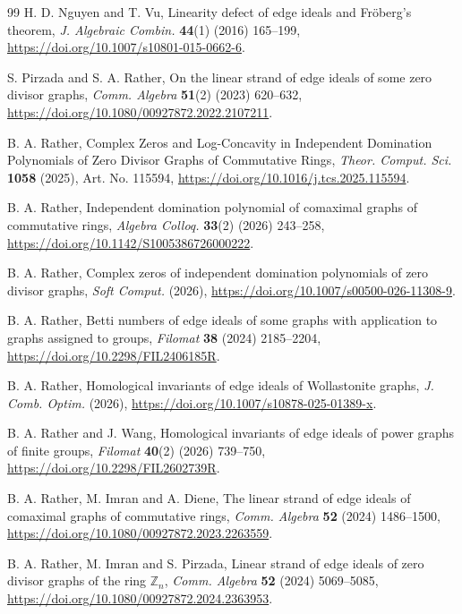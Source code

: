 \documentclass[12pt]{article}
\theoremstyle{definition}
\begin{document}
\begin{thebibliography}{99}
H. D. Nguyen and T. Vu,
Linearity defect of edge ideals and Fröberg's theorem,
\emph{J. Algebraic Combin.} \textbf{44}(1) (2016) 165--199,
\url{https://doi.org/10.1007/s10801-015-0662-6}.

S. Pirzada and S. A. Rather,
On the linear strand of edge ideals of some zero divisor graphs,
\emph{Comm. Algebra} \textbf{51}(2) (2023) 620--632,
\url{https://doi.org/10.1080/00927872.2022.2107211}.

B. A. Rather,
Complex Zeros and Log-Concavity in Independent Domination Polynomials of Zero Divisor Graphs of Commutative Rings,
\emph{Theor. Comput. Sci.} \textbf{1058} (2025), Art. No. 115594,
\url{https://doi.org/10.1016/j.tcs.2025.115594}.

B. A. Rather,
Independent domination polynomial of comaximal graphs of commutative rings,
\emph{Algebra Colloq.} \textbf{33}(2) (2026) 243--258,
\url{https://doi.org/10.1142/S1005386726000222}.

B. A. Rather,
Complex zeros of independent domination polynomials of zero divisor graphs,
\emph{Soft Comput.} (2026),
\url{https://doi.org/10.1007/s00500-026-11308-9}.

B. A. Rather,
Betti numbers of edge ideals of some graphs with application to graphs assigned to groups,
\emph{Filomat} \textbf{38} (2024) 2185--2204,
\url{https://doi.org/10.2298/FIL2406185R}.

B. A. Rather,
Homological invariants of edge ideals of Wollastonite graphs,
\emph{J. Comb. Optim.} (2026),
\url{https://doi.org/10.1007/s10878-025-01389-x}.

B. A. Rather and J. Wang,
Homological invariants of edge ideals of power graphs of finite groups,
\emph{Filomat} \textbf{40}(2) (2026) 739--750,
\url{https://doi.org/10.2298/FIL2602739R}.

B. A. Rather, M. Imran and A. Diene,
The linear strand of edge ideals of comaximal graphs of commutative rings,
\emph{Comm. Algebra} \textbf{52} (2024) 1486--1500,
\url{https://doi.org/10.1080/00927872.2023.2263559}.

B. A. Rather, M. Imran and S. Pirzada,
Linear strand of edge ideals of zero divisor graphs of the ring \(\mathbb{Z}_n\),
\emph{Comm. Algebra} \textbf{52} (2024) 5069--5085,
\url{https://doi.org/10.1080/00927872.2024.2363953}.


\end{thebibliography}
\end{document}
